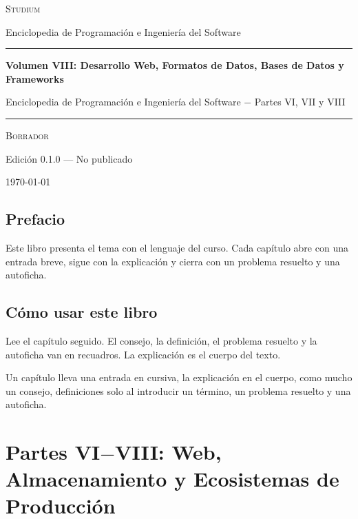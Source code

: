 \documentclass{book}
\begin{document}
\frontmatter
\thispagestyle{empty}
\setlength{\parindent}{0pt}
\vspace*{0.08\textheight}
{\normalsize\scshape\color{studiumInk} Studium\par}
{\small Enciclopedia de Programación e Ingeniería del Software\par}
\vspace{0.55em}
{\color{studiumRule}\rule{\linewidth}{0.9pt}\par}
\vspace{0.16\textheight}
{\raggedright\Huge\bfseries Volumen VIII: Desarrollo Web, Formatos de Datos, Bases de Datos y Frameworks\par}
\vspace{0.9em}
{\raggedright\Large\color{studiumInk} Enciclopedia de Programación e Ingeniería del Software \(-\) Partes VI, VII y VIII\par}
\vfill
{\color{studiumRule}\rule{0.36\linewidth}{0.45pt}\par}
\vspace{1.05em}
{\large\scshape Borrador\par}
\vspace{0.45em}
{\normalsize Edición 0.1.0 --- No publicado\par}
\vspace{0.4em}
{\normalsize\today\par}
\vspace*{0.08\textheight}
\clearpage
\chapter{Prefacio}
\noindent Este libro presenta el tema con el lenguaje del curso. Cada capítulo abre con una entrada breve, sigue con la explicación y cierra con un problema resuelto y una autoficha.
\chapter{Cómo usar este libro}
\noindent Lee el capítulo seguido. El consejo, la definición, el problema resuelto y la autoficha van en recuadros. La explicación es el cuerpo del texto.

\noindent Un capítulo lleva una entrada en cursiva, la explicación en el cuerpo, como mucho un consejo, definiciones solo al introducir un término, un problema resuelto y una autoficha.
\tableofcontents
\mainmatter

\part{Partes VI\(-\)VIII: Web, Almacenamiento y Ecosistemas de Producción}
\end{document}
